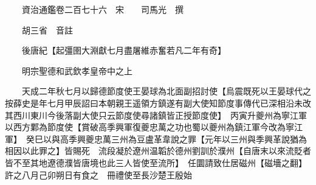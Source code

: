 










 


 
 


 

  
  
  
  
  





  
  
  
  
  
 
  

  

  
  
  



  

 
 

  
   




  

  
  


  　　資治通鑑卷二百七十六　宋　　司馬光　撰

　　胡三省　音註

　　後唐紀【起彊圉大淵獻七月盡屠維赤奮若凡二年有奇】

　　明宗聖德和武欽孝皇帝中之上

　　天成二年秋七月以歸德節度使王晏球為北面副招討使【烏震既死以王晏球代之按薛史是年七月甲辰詔曰本朝親王遥領方鎮遂有副大使知節度事傳代已深相沿未改其西川東川今後落副大使只云節度使尋諸鎮皆正授節度使】　丙寅升夔州為寧江軍以西方鄴為節度使【賞破高季興軍復夔忠萬之功也蜀以夔州為鎮江軍今改為寧江軍】　癸巳以與高季興夔忠萬三州為豆盧革韋說之罪【元年以三州與季興革說猶為相因以此罪之】皆賜死　流段凝於遼州温韜於德州劉訓於濮州【自唐末以來流貶者皆不至其地遼德濮皆唐境也此三人皆使至流所】　任圜請致仕居磁州【磁墻之翻】許之八月己卯朔日有食之　冊禮使至長沙楚王殷始

